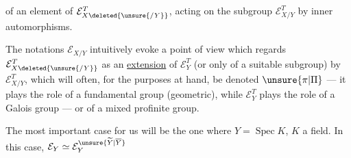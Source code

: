 
of an element of $\mathcal E_{X\deleted{\unsure{/Y}}}^T$, acting
on the subgroup $\mathcal E_{X/Y}^T$ by inner
automorphisms.

The notations  $\mathcal E_{X/Y}$ intuitively evoke
a point of view which
regards $\mathcal E_{X\deleted{\unsure{/Y}}}^T$ as an \uline{extension}
of $\mathcal E_Y^T$ (or only of a suitable
subgroup) by $\mathcal E_{X/Y}^T$,
which will often, for the purposes at
hand, be denoted $\unsure{\pi|\Pi}$ --- it plays the
role of a fundamental group
(geometric), while $\mathcal E_Y^T$ plays
the role of a Galois group ---
or of a mixed profinite group.


The most important case for us
will be the one where $Y=\operatorname{Spec}K$, $K$ a field.
 In this case, $\mathcal E_Y\simeq\mathcal E_Y^{\unsure{\widetilde Y|\overline Y}}$

